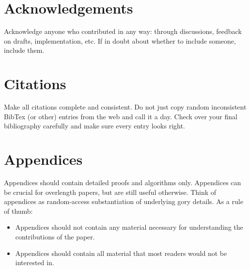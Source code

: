 \documentclass{article}
\begin{document}
\section{Acknowledgements}

Acknowledge anyone who contributed in any way: through discussions, feedback on drafts, implementation, etc. If in doubt about whether to include someone, include them.

\section{Citations}

Make all citations complete and consistent. Do not just copy random inconsistent BibTex (or other) entries from the web and call it a day. Check over your final bibliography carefully and make sure every entry looks right.

\section{Appendices}
Appendices should contain detailed proofs and algorithms only. Appendices can be crucial for overlength papers, but are still useful otherwise. Think of appendices as random-access substantiation of underlying gory details. As a rule of thumb:

\begin{itemize}
    \item Appendices should not contain any material necessary for understanding the contributions of the paper.
    \item Appendices should contain all material that most readers would not be interested in.
\end{itemize}



\end{document}
